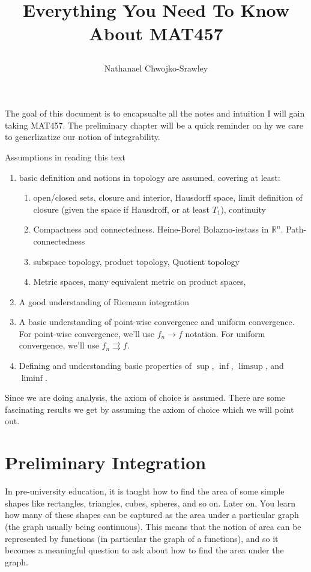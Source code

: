\documentclass[oneside]{book}
\title{ 
	\begin{huge}
		\bf{Everything You Need To Know About MAT457}
	\end{huge}
	}
\author{Nathanael Chwojko-Srawley}
\newcommand{\R}{\mathbb{R}}
\newcommand{\rw}{\rightarrow}
\newcommand{\rrw}{\rightrightarrows}
\begin{document}
\maketitle
\tableofcontents

\frontmatter
The goal of this document is to encapsualte all the notes and intuition I will gain taking MAT457. The preliminary
chapter will be a quick reminder on hy we care to generlizatize our notion of integrability. 

Assumptions in reading this text
\begin{enumerate}
	\item basic definition and notions in topology are assumed, covering at least:
		\begin{enumerate}
			\item open/closed sets, closure and interior, Hausdorff space, limit definition of closure (given the space
				if Hausdroff, or at least $T_1$), continuity
			\item Compactness and connectedness. Heine-Borel Bolazno-iestass in $\R^n$. Path-connectedness
				\item subspace topology, product topology, Quotient topology
			\item Metric spaces, many equivalent metric on product spaces,
		\end{enumerate}
	\item A good understanding of Riemann integration
	\item A basic understanding of point-wise convergence and uniform convergence. For point-wise convergence, we'll use
		$f_n \rw f$ notation. For uniform convergence, we'll use $f_n \rrw f$. 
	\item Defining and understanding basic properties of $\sup$, $\inf$, $\limsup$, and $\liminf$. 
\end{enumerate}

Since we are doing analysis, the axiom of choice is assumed. There are some fascinating results we get by assuming the
axiom of choice which we will point out. 

\chapter{Preliminary Integration}

In pre-university education, it is taught how to find the area of some simple shapes like rectangles, triangles, cubes,
spheres, and so on. Later on, You learn how many of these shapes can be captured as the area under a particular graph
(the graph usually being continuous). This means that the notion of area can be represented by functions (in particular
the graph of a functions), and so it becomes a meaningful question to ask about how to find the area under the graph. 
\end{document}
